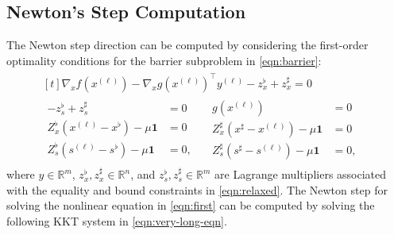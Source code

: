 \subsection{Newton's Step Computation}
The Newton step direction can be computed by considering the first-order optimality conditions for the barrier subproblem in \eqref{eqn:barrier}:
\begin{align}\label{eqn:first} 
  \begin{aligned}[t]
    \nabla_{x} f(x^{(\ell)}) - \nabla_{x}g(x^{(\ell)})^\top y^{(\ell)}  - z_x^\flat  + z_x^\sharp = 0\;&\\
    \begin{aligned}
      - z_s^\flat  + z_s^\sharp  &= 0\\
      Z^\flat_x (x^{(\ell)}-x^\flat) - \mu\boldsymbol{1} &= 0\\
      Z^\flat_s (s^{(\ell)}-s^\flat) - \mu\boldsymbol{1}&= 0,
    \end{aligned}
    \quad
    \begin{aligned}
      g(x^{(\ell)}) &= 0\\
      Z^\sharp_x (x^\sharp-x^{(\ell)}) - \mu\boldsymbol{1}&= 0\\
      Z^\sharp_s (s^\sharp-s^{(\ell)}) - \mu\boldsymbol{1}&= 0,
    \end{aligned}&
  \end{aligned}
\end{align}
where $y\in\mathbb{R}^{m}$, $z_x^\flat,z_x^\sharp\in\mathbb{R}^{n}$,
and $z_s^\flat,z_s^\sharp\in\mathbb{R}^{m}$ are Lagrange multipliers
associated with the equality and bound constraints in
\eqref{eqn:relaxed}. The Newton step for solving the nonlinear
equation in \eqref{eqn:first} can be computed by solving the following
KKT system in \eqref{eqn:very-long-eqn}.

